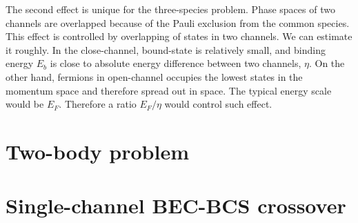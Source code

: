 The second effect is unique for the three-species problem.  Phase spaces of two channels are overlapped because of the Pauli exclusion from the common species. This effect is controlled by overlapping of states in two channels. We can estimate it roughly.  In the close-channel, bound-state is relatively small, and binding energy $E_b$ is close to absolute energy difference between two channels, $\eta$.  On the other hand, fermions in open-channel occupies the lowest states in the momentum space and therefore spread out in space.  The typical energy scale would be $E_F$.  Therefore a ratio $E_F/\eta$ would control such effect. 

\section{Two-body problem}
\section{Single-channel BEC-BCS crossover}